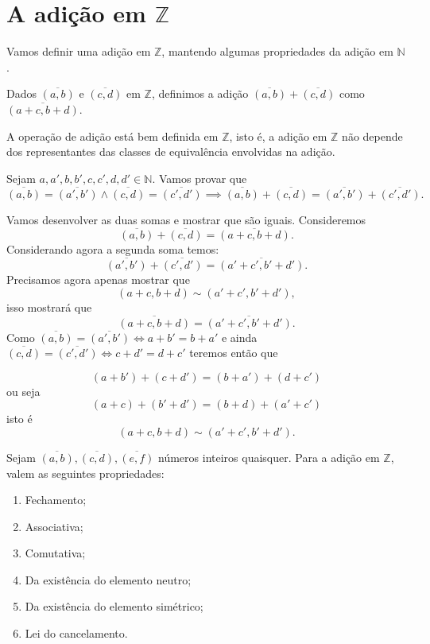 \documentclass[../main.tex]{subfiles}
\begin{document}
\section{A adição em $\mathbb{Z}$}
Vamos definir uma adição em $\mathbb{Z}$, mantendo algumas propriedades da adição em $\mathbb{N}$.
\begin{defi}\label{int-def-soma}
    Dados $\overline{(a,b)}$ e $\overline{(c,d)}$ em $\mathbb{Z}$, definimos a adição $\overline{(a,b)} + \overline{(c,d)}$ como $\overline{(a+c, b+d)}$.
\end{defi}
\begin{prop}
    A operação de adição está bem definida em $\mathbb{Z}$, isto é, a adição em $\mathbb{Z}$ não depende dos representantes das classes de equivalência envolvidas na adição. 
\end{prop}
\begin{dem}
    Sejam $a,a',b,b',c,c',d,d' \in \mathbb{N}$. Vamos provar que 
    \[ \overline{(a,b)} = \overline{(a',b')} \land \overline{(c,d)} = \overline{(c',d')}
    \implies \overline{(a,b)} + \overline{(c,d)} = \overline{(a',b')} + \overline{(c',d')}. \]

    \noindent Vamos desenvolver as duas somas e mostrar que são iguais. Consideremos  
    \[\overline{(a,b)} + \overline{(c,d)} = \overline{(a+c,b+d)}.\]
    Considerando agora a segunda soma temos: 
    \[ \overline{(a',b')} + \overline{(c',d')} = \overline{(a'+c',b'+d')}. \]
    Precisamos agora apenas mostrar que 
    \[ (a+c,b+d) \sim (a'+c',b'+d'), \]
    isso mostrará que 
    \[ \overline{(a+c,b+d)} = \overline{(a'+c',b'+d')}. \] 
    Como $\overline{(a,b)} = \overline{(a',b')} \iff a+b' = b+a'$ e ainda
     $\overline{(c,d)} = \overline{(c',d')} \iff c+d' = d+c'$ teremos então que  
    
         \[ (a+b')+(c+d') = (b+a')+(d+c') \]
         ou seja
         \[ (a+c) + (b'+d') = (b+d) + (a'+c') \]
         isto é
         \[ (a+c,b+d) \sim (a'+c',b'+d'). \]
    
\end{dem}

\begin{teo}\label{int-teo-somaPropriedades}
    Sejam $\overline{(a,b)}, \overline{(c,d)}, \overline{(e,f)}$ números inteiros quaisquer. Para a adição em $\mathbb{Z}$, valem as seguintes propriedades:
    \begin{enumerate}[label=(\roman*)]
        \item Fechamento;
        \item Associativa;
        \item Comutativa;
        \item Da existência do elemento neutro; 
        \item Da existência do elemento simétrico;
        \item Lei do cancelamento.
    \end{enumerate}
\end{teo}
\end{document}
